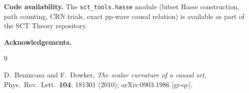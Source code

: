 \documentclass[11pt,a4paper]{article}
\begin{document}
\medskip\noindent
\textbf{Code availability.}\;
The \texttt{sct\_tools.hasse} module (bitset Hasse construction, path counting, CRN trials,
exact pp-wave causal relation) is available as part of the SCT Theory repository.

\bigskip\noindent
\textbf{Acknowledgements.}\;

\begin{thebibliography}{9}

  D.~Benincasa and F.~Dowker,
  \textit{The scalar curvature of a causal set},
  Phys.\ Rev.\ Lett.\ \textbf{104}, 181301 (2010);
  arXiv:0903.1986 [gr-qc].

\end{thebibliography}
\end{document}
